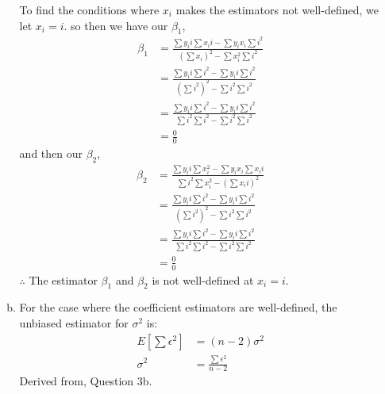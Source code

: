 \documentclass[12pt]{article}
\begin{document}
\begin{enumerate}[1.]
\begin{enumerate}[(a)]
            To find the conditions where $x_i$ makes the estimators not well-defined, we let $x_i = i$.
            so then we have our $\beta_1$,
            \begin{align*}
                \beta_1 &= \frac{\sum y_i i\sum  x_i i - \sum y_i  x_i \sum i^2}{(\sum  x_i)^2 - \sum  x_i^2 \sum i^2 } \\
                &= \frac{\sum y_i i\sum  i^2 - \sum y_i  i \sum i^2}{(\sum i^2)^2 - \sum i^2 \sum i^2 }\\
                &= \frac{\sum y_i i\sum  i^2 - \sum y_i  i \sum i^2}{\sum i^2\sum i^2 - \sum i^2 \sum i^2 }\\
                &= \frac{0}{0}
            \end{align*}
            and then our $\beta_2$, 
            \begin{align*}
                \beta_2 &= \frac{\sum  y_i i \sum  x_i^2 - \sum  y_i x_i \sum  x_i i}{\sum  i^2 \sum  x_i^2 - (\sum  x_i i)^2} \\
                &= \frac{\sum  y_i i \sum   i^2 - \sum  y_i  i \sum   i^2}{(\sum i^2)^2 - \sum i^2 \sum i^2 }\\
                &= \frac{\sum  y_i i \sum   i^2 - \sum  y_i  i \sum   i^2}{\sum i^2 \sum i^2 - \sum i^2 \sum i^2 }\\
                &= \frac{0}{0}
            \end{align*}
            $\therefore$ The estimator $\beta_1$ and $\beta_2$ is not well-defined at $x_i = i$.

            \item For the case where the coefficient estimators are well-defined, the unbiased estimator for $\sigma^2$ is:
            \begin{align*}
                E[\sum \epsilon^2] &= (n-2)\sigma^2 \\ 
                \sigma^2 &= \frac{\sum \epsilon^2}{n-2}
            \end{align*}
            Derived from, Question 3b.
            

\end{enumerate}
\end{enumerate}
\end{document}
